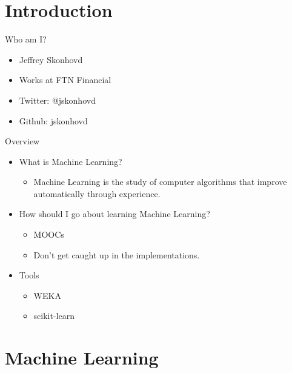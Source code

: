 \section{Introduction}\label{introduction}

\begin{frame}{Who am I?}

\begin{itemize}
\itemsep1pt\parskip0pt
\item
  Jeffrey Skonhovd
\item
  Works at FTN Financial
\item
  Twitter: @jskonhovd
\item
  Github: jskonhovd
\end{itemize}

\end{frame}

\begin{frame}{Overview}

\begin{itemize}
\itemsep1pt\parskip0pt
\item
  What is Machine Learning?

  \begin{itemize}
  \itemsep1pt\parskip0pt
  \item
    Machine Learning is the study of computer algorithms that improve
    automatically through experience.
  \end{itemize}
\item
  How should I go about learning Machine Learning?

  \begin{itemize}
  \itemsep1pt\parskip0pt
  \item
    MOOCs
  \item
    Don't get caught up in the implementations.
  \end{itemize}
\item
  Tools

  \begin{itemize}
  \itemsep1pt\parskip0pt
  \item
    WEKA
  \item
    scikit-learn
  \end{itemize}
\end{itemize}

\end{frame}

\section{Machine Learning}\label{machine-learning}

